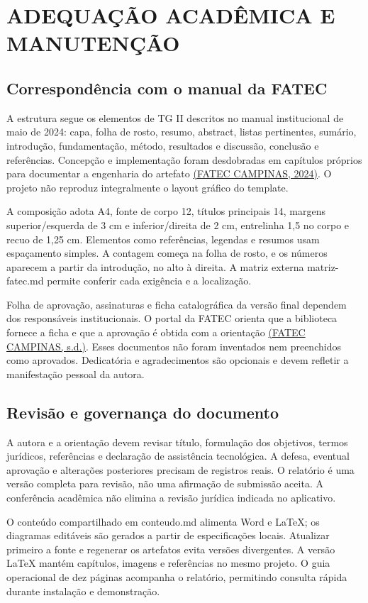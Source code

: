 \chapter{ADEQUAÇÃO ACADÊMICA E MANUTENÇÃO}
\label{chapter-F}
\section{Correspondência com o manual da FATEC}
\label{section-F-1}
A estrutura segue os elementos de TG II descritos no manual institucional de maio de 2024: capa, folha de rosto, resumo, abstract, listas pertinentes, sumário, introdução, fundamentação, método, resultados e discussão, conclusão e referências. Concepção e implementação foram desdobradas em capítulos próprios para documentar a engenharia do artefato \hyperref[ref:FATECMANUAL]{(FATEC CAMPINAS, 2024)}. O projeto não reproduz integralmente o layout gráfico do template.

A composição adota A4, fonte de corpo 12, títulos principais 14, margens superior/esquerda de 3 cm e inferior/direita de 2 cm, entrelinha 1,5 no corpo e recuo de 1,25 cm. Elementos como referências, legendas e resumos usam espaçamento simples. A contagem começa na folha de rosto, e os números aparecem a partir da introdução, no alto à direita. A matriz externa matriz-fatec.md permite conferir cada exigência e a localização.

Folha de aprovação, assinaturas e ficha catalográfica da versão final dependem dos responsáveis institucionais. O portal da FATEC orienta que a biblioteca fornece a ficha e que a aprovação é obtida com a orientação \hyperref[ref:FATECPORTAL]{(FATEC CAMPINAS, s.d.)}. Esses documentos não foram inventados nem preenchidos como aprovados. Dedicatória e agradecimentos são opcionais e devem refletir a manifestação pessoal da autora.

\section{Revisão e governança do documento}
\label{section-F-2}
A autora e a orientação devem revisar título, formulação dos objetivos, termos jurídicos, referências e declaração de assistência tecnológica. A defesa, eventual aprovação e alterações posteriores precisam de registros reais. O relatório é uma versão completa para revisão, não uma afirmação de submissão aceita. A conferência acadêmica não elimina a revisão jurídica indicada no aplicativo.

O conteúdo compartilhado em conteudo.md alimenta Word e LaTeX; os diagramas editáveis são gerados a partir de especificações locais. Atualizar primeiro a fonte e regenerar os artefatos evita versões divergentes. A versão LaTeX mantém capítulos, imagens e referências no mesmo projeto. O guia operacional de dez páginas acompanha o relatório, permitindo consulta rápida durante instalação e demonstração.
